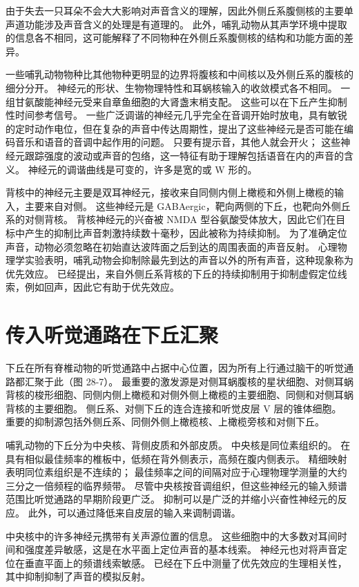 由于失去一只耳朵不会大大影响对声音含义的理解，因此外侧丘系腹侧核的主要单声道功能涉及声音含义的处理是有道理的。 此外，哺乳动物从其声学环境中提取的信息各不相同，这可能解释了不同物种在外侧丘系腹侧核的结构和功能方面的差异。

一些哺乳动物物种比其他物种更明显的边界将腹核和中间核以及外侧丘系的腹核的细分分开。 神经元的形状、生物物理特性和耳蜗核输入的收敛模式各不相同。 一组甘氨酸能神经元受来自章鱼细胞的大肾盏末梢支配。 这些可以在下丘产生抑制性时间参考信号。 一些广泛调谐的神经元几乎完全在音调开始时放电，具有敏锐的定时动作电位，但在复杂的声音中传达周期性，提出了这些神经元是否可能在编码音乐和语音的音调中起作用的问题。 只要有提示音，其他人就会开火； 这些神经元跟踪强度的波动或声音的包络，这一特征有助于理解包括语音在内的声音的含义。 神经元的调谐曲线是可变的，许多是宽的或 W 形的。

背核中的神经元主要是双耳神经元，接收来自同侧内侧上橄榄和外侧上橄榄的输入，主要来自对侧。 这些神经元是 GABAergic，靶向两侧的下丘，也靶向外侧丘系的对侧背核。 背核神经元的兴奋被 NMDA 型谷氨酸受体放大，因此它们在目标中产生的抑制比声音刺激持续数十毫秒，因此被称为持续抑制。 为了准确定位声音，动物必须忽略在初始直达波阵面之后到达的周围表面的声音反射。 心理物理学实验表明，哺乳动物会抑制除最先到达的声音以外的所有声音，这种现象称为优先效应。 已经提出，来自外侧丘系背核的下丘的持续抑制用于抑制虚假定位线索，例如回声，因此它有助于优先效应。


\section{传入听觉通路在下丘汇聚}
下丘在所有脊椎动物的听觉通路中占据中心位置，因为所有上行通过脑干的听觉通路都汇聚于此（图 28-7）。 最重要的激发源是对侧耳蜗腹核的星状细胞、对侧耳蜗背核的梭形细胞、同侧内侧上橄榄和对侧外侧上橄榄的主要细胞、同侧和对侧耳蜗背核的主要细胞。 侧丘系、对侧下丘的连合连接和听觉皮层 V 层的锥体细胞。 重要的抑制源包括外侧丘系、同侧外侧上橄榄核、上橄榄旁核和对侧下丘。

哺乳动物的下丘分为中央核、背侧皮质和外部皮质。 中央核是同位素组织的。 在具有相似最佳频率的椎板中，低频在背外侧表示，高频在腹内侧表示。 精细映射表明同位素组织是不连续的； 最佳频率之间的间隔对应于心理物理学测量的大约三分之一倍频程的临界频带。 尽管中央核按音调组织，但这些神经元的输入频谱范围比听觉通路的早期阶段更广泛。 抑制可以是广泛的并缩小兴奋性神经元的反应。 此外，可以通过降低来自皮层的输入来调制调谐。

中央核中的许多神经元携带有关声源位置的信息。 这些细胞中的大多数对耳间时间和强度差异敏感，这是在水平面上定位声音的基本线索。 神经元也对将声音定位在垂直平面上的频谱线索敏感。 已经在下丘中测量了优先效应的生理相关性，其中抑制抑制了声音的模拟反射。

